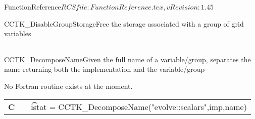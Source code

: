 \begin{cactuspart}{5}{FunctionReference}{$RCSfile: FunctionReference.tex,v $}{$Revision: 1.45 $}
\begin{CCTKFunc}{CCTK\_DisableGroupStorage}{Free the storage associated with a group of grid variables}
\label{CCTK-DisableGroupStorage}
\showcargs
\begin{params}
\end{params}
\begin{discussion}
\end{discussion}
\begin{examples}
\begin{tabular}{@{}p{3cm}cp{11cm}}
\end{tabular}
\end{examples}
\begin{errorcodes}
\end{errorcodes}
\end{CCTKFunc}



\begin{CCTKFunc}{CCTK\_DecomposeName}{Given the full name of a variable/group, separates the name returning both the implementation and the variable/group}
\label{CCTK-DecomposeName}
\showcargs
\begin{params}
\end{params}
\begin{discussion}
No Fortran routine exists at the moment.
\end{discussion}
\begin{examples}
\begin{tabular}{@{}p{3cm}cp{11cm}}
\hfill {\bf C} && {\t istat = CCTK\_DecomposeName("evolve::scalars",imp,name)}\\
\end{tabular}
\end{examples}
\begin{errorcodes}
\end{errorcodes}
\end{CCTKFunc}








\end{cactuspart}
